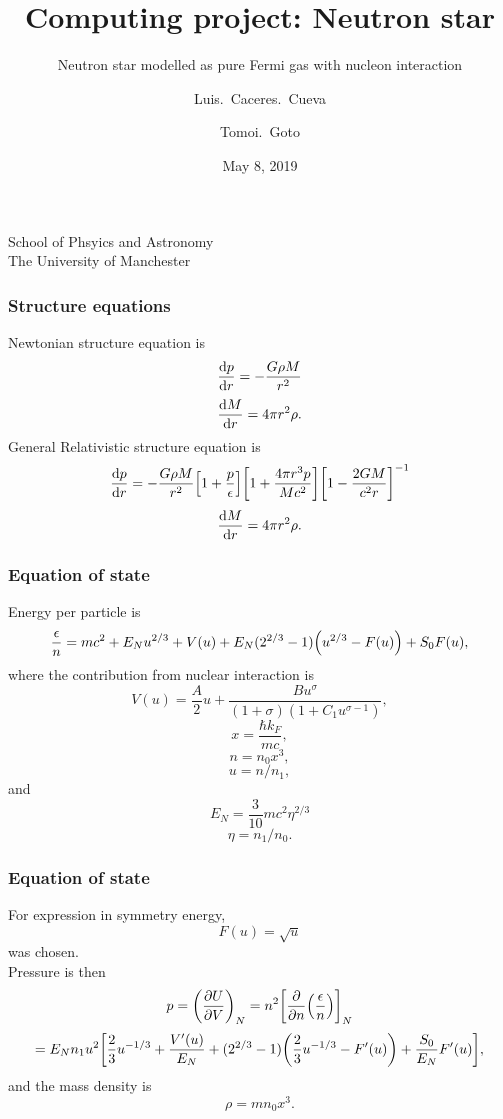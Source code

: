 \documentclass[hperref={pdfpagelabels=false}]{beamer}
\begin{document}
\title
{Computing project: Neutron star}

\subtitle{Neutron star modelled as pure Fermi gas with nucleon interaction}

\author
{Luis.~Caceres.~Cueva \and Tomoi.~Goto}

\institute
{
    School of Phsyics and Astronomy\\
    The University of Manchester
}
\date
{May 8, 2019}

\begin{frame}
 \titlepage
\end{frame}

\begin{frame}
 \frametitle{Structure equations}
 Newtonian structure equation is
\[\dv{p}{r}=-\frac{G\rho M}{r^{2}}\]
\[\dv{M}{r}=4\pi r^{2}\rho.\]
General Relativistic structure equation is
\[\dv{p}{r}=-\frac{G\rho M}{r^{2}}\qty[1+\frac{p}{\epsilon}]\qty[1+\frac{4\pi r^{3}p}{Mc^{2}}]\qty[1-\frac{2GM}{c^{2}r}]^{-1}\]
\[\dv{M}{r}=4\pi r^{2}\rho.\]
\end{frame}

\begin{frame}
 \frametitle{Equation of state}
 Energy per particle is
\[\frac{\epsilon}{n}=mc^{2}+E_{N}u^{2/3}+V(u)+E_{N}(2^{2/3}-1)\qty(u^{2/3}-F(u))+S_{0}F(u),\]
 where the contribution from nuclear interaction is
 \[V(u)=\frac{A}{2}u+\frac{Bu^{\sigma}}{(1+\sigma)(1+C_{1}u^{\sigma-1})},\]
\[x=\frac{\hbar k_{F}}{mc},\]
 \[n=n_{0}x^{3},\]
 \[u=n/n_{1},\]
 and
 \[E_{N}=\frac{3}{10}mc^{2}\eta^{2/3}\]
 \[\eta=n_{1}/n_{0}.\]
\end{frame}

\begin{frame}
\frametitle{Equation of state}
 For expression in symmetry energy,
 \[F(u)=\sqrt{u}\]
 was chosen.\\
 Pressure is then 
 \[p=\qty(\pdv{U}{V})_{N}=n^{2}\qty[\pdv{n}(\frac{\epsilon}{n})]_{N}\]
 \[=E_{N}n_{1}u^{2}\qty[\frac{2}{3}u^{-1/3}+\frac{V'(u)}{E_{N}}+(2^{2/3}-1)\qty(\frac{2}{3}u^{-1/3}-F'(u))+\frac{S_{0}}{E_{N}}F'(u)],\]
 and the mass density is
 \[\rho=mn_{0}x^{3}.\]
\end{frame}
\end{document}
